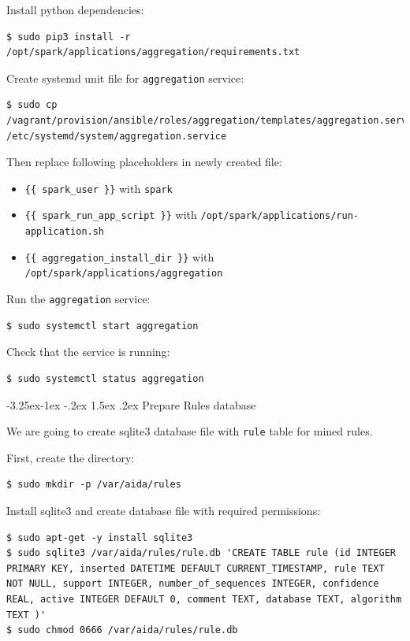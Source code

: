 \documentclass[a4paper]{article} %
\makeatletter
\renewcommand{\normalsize}{\fontsize{12}{15}\selectfont\color{textcolor}}
\renewcommand\subsubsection{\@startsection{subsubsection}{3}{\z@}%
                   {-3.25ex\@plus -1ex \@minus -.2ex}%
                   {1.5ex \@plus .2ex}%
                   {\normalfont\sffamily\normalsize\bfseries\color{projectcolor}}}
\makeatother
\begin{document}
Install python dependencies:
\begin{lstlisting}
$ sudo pip3 install -r /opt/spark/applications/aggregation/requirements.txt
\end{lstlisting}

Create systemd unit file for \texttt{aggregation} service:
\begin{lstlisting}
$ sudo cp /vagrant/provision/ansible/roles/aggregation/templates/aggregation.service.j2 /etc/systemd/system/aggregation.service
\end{lstlisting}

Then replace following placeholders in newly created file:
\begin{itemize}[noitemsep,nolistsep]
\item \texttt{\{\{ spark\_user \}\}} with \texttt{spark}
\item \texttt{\{\{ spark\_run\_app\_script \}\}} with \texttt{/opt/spark/applications/run-application.sh}
\item \texttt{\{\{ aggregation\_install\_dir \}\}} with \texttt{/opt/spark/applications/aggregation}
\end{itemize}

Run the \texttt{aggregation} service:
\begin{lstlisting}
$ sudo systemctl start aggregation
\end{lstlisting}

Check that the service is running:
\begin{lstlisting}
$ sudo systemctl status aggregation
\end{lstlisting}


\subsubsection{Prepare Rules database}

We are going to create sqlite3 database file with \texttt{rule} table for mined rules.

First, create the directory:
\begin{lstlisting}
$ sudo mkdir -p /var/aida/rules
\end{lstlisting}

Install sqlite3 and create database file with required permissions:
\begin{lstlisting}
$ sudo apt-get -y install sqlite3
$ sudo sqlite3 /var/aida/rules/rule.db 'CREATE TABLE rule (id INTEGER PRIMARY KEY, inserted DATETIME DEFAULT CURRENT_TIMESTAMP, rule TEXT NOT NULL, support INTEGER, number_of_sequences INTEGER, confidence REAL, active INTEGER DEFAULT 0, comment TEXT, database TEXT, algorithm TEXT )'
$ sudo chmod 0666 /var/aida/rules/rule.db
\end{lstlisting}
\end{document}
